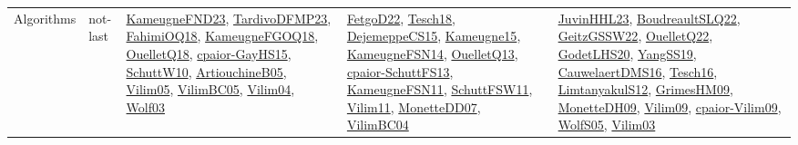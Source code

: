 {\begin{longtable}{lp{3cm}>{\raggedright}p{6cm}>{\raggedright}p{6cm}p{8cm}}
Algorithms & not-last & \href{papers/KameugneFND23.pdf}{KameugneFND23}\cite{KameugneFND23}, \href{papers/TardivoDFMP23.pdf}{TardivoDFMP23}\cite{TardivoDFMP23}, \href{articles/FahimiOQ18.pdf}{FahimiOQ18}\cite{FahimiOQ18}, \href{papers/KameugneFGOQ18.pdf}{KameugneFGOQ18}\cite{KameugneFGOQ18}, \href{papers/OuelletQ18.pdf}{OuelletQ18}\cite{OuelletQ18}, \href{papers/cpaior-GayHS15.pdf}{cpaior-GayHS15}\cite{cpaior-GayHS15}, \href{papers/SchuttW10.pdf}{SchuttW10}\cite{SchuttW10}, \href{papers/ArtiouchineB05.pdf}{ArtiouchineB05}\cite{ArtiouchineB05}, \href{papers/Vilim05.pdf}{Vilim05}\cite{Vilim05}, \href{articles/VilimBC05.pdf}{VilimBC05}\cite{VilimBC05}, \href{papers/Vilim04.pdf}{Vilim04}\cite{Vilim04}, \href{papers/Wolf03.pdf}{Wolf03}\cite{Wolf03} & \href{articles/FetgoD22.pdf}{FetgoD22}\cite{FetgoD22}, \href{papers/Tesch18.pdf}{Tesch18}\cite{Tesch18}, \href{papers/DejemeppeCS15.pdf}{DejemeppeCS15}\cite{DejemeppeCS15}, \href{articles/Kameugne15.pdf}{Kameugne15}\cite{Kameugne15}, \href{articles/KameugneFSN14.pdf}{KameugneFSN14}\cite{KameugneFSN14}, \href{papers/OuelletQ13.pdf}{OuelletQ13}\cite{OuelletQ13}, \href{papers/cpaior-SchuttFS13.pdf}{cpaior-SchuttFS13}\cite{cpaior-SchuttFS13}, \href{papers/KameugneFSN11.pdf}{KameugneFSN11}\cite{KameugneFSN11}, \href{articles/SchuttFSW11.pdf}{SchuttFSW11}\cite{SchuttFSW11}, \href{papers/Vilim11.pdf}{Vilim11}\cite{Vilim11}, \href{papers/MonetteDD07.pdf}{MonetteDD07}\cite{MonetteDD07}, \href{papers/VilimBC04.pdf}{VilimBC04}\cite{VilimBC04} & \href{papers/JuvinHHL23.pdf}{JuvinHHL23}\cite{JuvinHHL23}, \href{papers/BoudreaultSLQ22.pdf}{BoudreaultSLQ22}\cite{BoudreaultSLQ22}, \href{papers/GeitzGSSW22.pdf}{GeitzGSSW22}\cite{GeitzGSSW22}, \href{papers/OuelletQ22.pdf}{OuelletQ22}\cite{OuelletQ22}, \href{papers/GodetLHS20.pdf}{GodetLHS20}\cite{GodetLHS20}, \href{papers/YangSS19.pdf}{YangSS19}\cite{YangSS19}, \href{papers/CauwelaertDMS16.pdf}{CauwelaertDMS16}\cite{CauwelaertDMS16}, \href{papers/Tesch16.pdf}{Tesch16}\cite{Tesch16}, \href{articles/LimtanyakulS12.pdf}{LimtanyakulS12}\cite{LimtanyakulS12}, \href{papers/GrimesHM09.pdf}{GrimesHM09}\cite{GrimesHM09}, \href{papers/MonetteDH09.pdf}{MonetteDH09}\cite{MonetteDH09}, \href{papers/Vilim09.pdf}{Vilim09}\cite{Vilim09}, \href{papers/cpaior-Vilim09.pdf}{cpaior-Vilim09}\cite{cpaior-Vilim09}, \href{papers/WolfS05.pdf}{WolfS05}\cite{WolfS05}, \href{papers/Vilim03.pdf}{Vilim03}\cite{Vilim03}\\

\end{longtable}}
